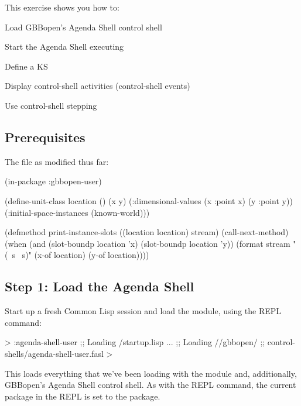 \documentclass[10pt,twoside,english,pdftex]{article}
\begin{document}
\fndocrule

This exercise shows you how to:
\begin{tightitemize}
\item Load GBBopen's Agenda Shell control shell
\item Start the Agenda Shell executing
\item Define a KS
\item Display control-shell activities (control-shell events)
\item Use control-shell stepping
\end{tightitemize}

\fndocrule

\subsection*{Prerequisites}

The  file as modified thus far:

\begin{example}
  (in-package :gbbopen-user)

  (define-unit-class location ()
    (x y)
    (:dimensional-values
      (x :point x)
      (y :point y))
    (:initial-space-instances (known-world)))

  (defmethod print-instance-slots ((location location) stream)
    (call-next-method)
    (when (and (slot-boundp location 'x)
               (slot-boundp location 'y))
      (format stream " (~s ~s)"
              (x-of location)
              (y-of location))))
\end{example}


\subsection*{Step 1: Load the Agenda Shell}

Start up a fresh Common Lisp session and load the 
module, using the  REPL command:
%
\begin{example}\color{darkergray}%
  > \textcolor{black}{:agenda-shell-user}
  ;; Loading /startup.lisp
     ...
  ;; Loading //gbbopen/
  ;;            control-shells/agenda-shell-user.fasl
  >
\end{example}

This loads everything that we've been loading with the 
module and, additionally, GBBopen's Agenda Shell control shell. As with the
 REPL command, the current package in the REPL is set to
the  package.
\end{document}
